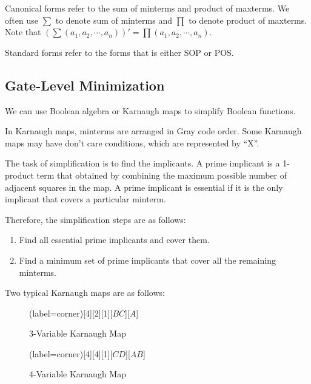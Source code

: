 \documentclass[a4paper,12pt]{article}
\begin{document}
Canonical forms refer to the sum of minterms and product of maxterms.
We often use $\sum$ to denote sum of minterms and $\prod$ to denote product of maxterms.
Note that $(\sum(a_1, a_2, \cdots, a_n))' = \prod(a_1, a_2, \cdots, a_n)$.

Standard forms refer to the forms that is either SOP or POS.

\subsection{Gate-Level Minimization}

We can use Boolean algebra or Karnaugh maps to simplify Boolean functions.

In Karnaugh maps, minterms are arranged in Gray code order.
Some Karnaugh maps may have don't care conditions, which are represented by ``X''.

The task of simplification is to find the implicants.
A prime implicant is a 1-product term that obtained by combining the maximum possible number of adjacent squares in the map.
A prime implicant is essential if it is the only implicant that covers a particular minterm.

Therefore, the simplification steps are as follows:
\begin{enumerate}
	\item Find all essential prime implicants and cover them.
	\item Find a minimum set of prime implicants that cover all the remaining minterms.
\end{enumerate}

Two typical Karnaugh maps are as follows:
\begin{figure}[H]
	\begin{minipage}{0.5\textwidth}
		\centering
		\begin{karnaugh-map}(label=corner)[4][2][1][$BC$][$A$]
		\end{karnaugh-map}
		\caption*{3-Variable Karnaugh Map}
	\end{minipage}
	\begin{minipage}{0.5\textwidth}
		\centering
		\begin{karnaugh-map}(label=corner)[4][4][1][$CD$][$AB$]
		\end{karnaugh-map}
		\caption*{4-Variable Karnaugh Map}
	\end{minipage}
\end{figure}
\end{document}
